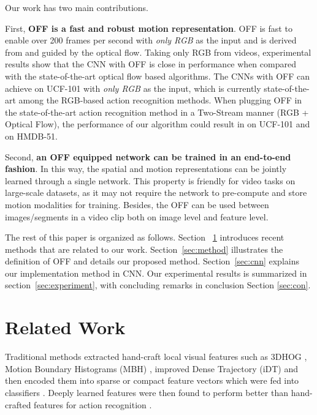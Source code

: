 \documentclass[10pt,twocolumn,letterpaper]{article}
\begin{document}
Our work has two main contributions. 


First, \textbf{OFF is a fast and robust motion representation}. OFF is fast to enable over 200 frames per second with \textit{only RGB} as the input and is derived from and guided by the optical flow. Taking only RGB from videos, experimental results show that the CNN with OFF is close in performance when compared with the state-of-the-art optical flow based algorithms. The CNNs with OFF can achieve  on UCF-101 with \textit{only RGB} as the input, which is currently state-of-the-art among the RGB-based action recognition methods. When plugging OFF in the state-of-the-art action recognition method \cite{wang2016tsn} in a Two-Stream manner (RGB + Optical Flow), the performance of our algorithm could result in  on UCF-101 and  on HMDB-51.



Second, \textbf{an OFF equipped network can be trained in an end-to-end fashion}. In this way, the spatial and motion representations can be jointly learned through a single network. This property is friendly for video tasks on large-scale datasets, as it may not require the network to pre-compute and store motion modalities for training. Besides, the OFF can be used between images/segments  in a video clip both on image level and feature level. 



The rest of this paper is organized as follows. Section ~\ref{sec:relate} introduces recent methods that are related to our work. Section~\ref{sec:method} illustrates the definition of OFF and details our proposed method. Section~\ref{sec:cnn} explains our implementation method in CNN. Our experimental results is summarized in section~\ref{sec:experiment}, with concluding remarks in conclusion Section \ref{sec:con}.













\section{Related Work}
\label{sec:relate}

Traditional methods extracted hand-craft local visual features such as 3DHOG \cite{Klaser2008}, Motion Boundary Histograms (MBH) \cite{Dalal2006}, improved Dense Trajectory (iDT) \cite{wang2013idt, wang2011idt} and then encoded them into sparse or compact feature vectors which were fed into classifiers \cite{Scovanner2007,Peng2014}. Deeply learned features were then found to perform better than hand-crafted features for action recognition \cite{simonyan2014two,wang2015tdd}.  
\end{document}

